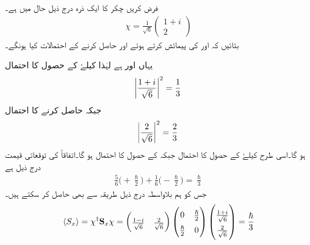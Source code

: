 فرض کریں  چکر کا ایک ذرہ درج ذیل حال میں ہے۔
\begin{align} 
 \chi=\frac{1}{\sqrt{6}}\begin{pmatrix} 1+i \\ 2 \end{pmatrix} 
 \end{align}
بتائیں  کہ  اور  کی پیمائش کرتے  ہوئے  اور  حاصل کرنے کے احتمالات کیا ہونگے۔


\quad
یہاں  اور  ہے  لہٰذا  کیلۓ   کے حصول کا احتمال
\begin{align*}
 \abs{\frac{1+i}{\sqrt{6}}}^2=\frac{1}{3} 
\end{align*}
  جبکہ  حاصل کرنے کا احتمال
  \begin{align*}
   \abs{\frac{2}{\sqrt{6}}}^2 =\frac{2}{3} 
  \end{align*}
   ہو گا۔اسی طرح    کیلۓ  کے حصول کا احتمال    جبکہ  کے حصول کا احتمال
   ہو گا۔اتفاقاً  کی توقعاتی قیمت درج ذیل ہے
\begin{align*} 
 \frac{5}{6}\big(+\frac{\hslash}{2}\big)+\frac{1}{6}\big(-\frac{\hslash}{2}\big)=\frac{\hslash}{3} 
 \end{align*}
جس کو ہم   بلاواسطہ  درج ذیل طریقہ سے بھی حاصل کر سکتے ہیں۔
\begin{align*} 
\renewcommand{\arraystretch}{1.5}
 \langle S_{x}\rangle=\chi^{\dagger}\bold{S}_{x}\chi=\begin{pmatrix}\frac{1-i}{\sqrt{6}} & \frac{2}{\sqrt{6}} \end{pmatrix} \begin{pmatrix} 0&\tfrac{\hslash}{2} \\ \tfrac{\hslash}{2}&0 \end{pmatrix} \begin{pmatrix}\tfrac{1+i}{\sqrt{6}} \\ \tfrac{2}{\sqrt{6}}\end{pmatrix} =\frac{\hslash}{3}
 \end{align*} 


